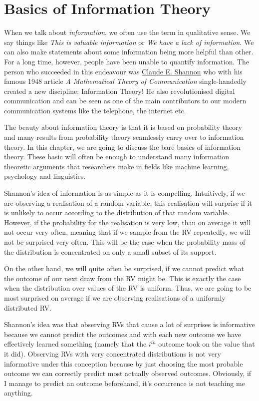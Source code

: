 \section{Basics of Information Theory}

When we talk about \textit{information}, we often use the term in qualitative sense. We say things like \textit{This is valuable information} or 
\textit{We have a lack of information}. We can also make statements about some information being more helpful than other. For a long time, however,
people have been unable to quantify information. The person who succeeded in this endeavour was \href{https://en.wikipedia.org/wiki/Claude_Shannon}{Claude E. Shannon}
who with his famous 1948 article \textit{A Mathematical Theory of Communication} single-handedly created a new discipline: Information Theory! He also revolutionised
digital communication and can be seen as one of the main contributors to our modern communication systems like the telephone, the internet etc. 

The beauty about information theory is that it is based on probability theory and many results from probability theory seamlessly carry over to information theory.
In this chapter, we are going to discuss the bare basics of information theory. These basic will often be enough to understand many information theoretic arguments
that researchers make in fields like machine learning, psychology and linguistics.

Shannon's idea of information is as simple as it is compelling. Intuitively, if we are observing a realisation of a random variable, this realisation will surprise
if it is unlikely to occur according to the distribution of that random variable. However, if the probability for the realisation is very low, than on average it
will not occur very often, meaning that if we sample from the RV repeatedly, we will not be surprised very often. This will be the case when the probability
mass of the distribution is concentrated on only a small subset of its support. 

On the other hand, we will quite often be surprised,
if we cannot predict what the outcome of our next draw from the RV might be. This is exactly the case when the distribution over values of the RV is uniform. Thus,
we are going to be most surprised on average if we are observing realisations of a uniformly distributed RV.

Shannon's idea was that observing RVs that cause a lot of surprises is informative because we cannot predict the outcomes and with each new outcome we have effectively
learned something  (namely that the $ i^{th} $ outcome took on the value that it did). Observing RVs with very concentrated distributions is not very informative
under this conception because by just choosing the most probable outcome we can correctly predict most actually observed outcomes. Obviously, if I manage to predict
an outcome beforehand, it's occurrence is not teaching me anything.

